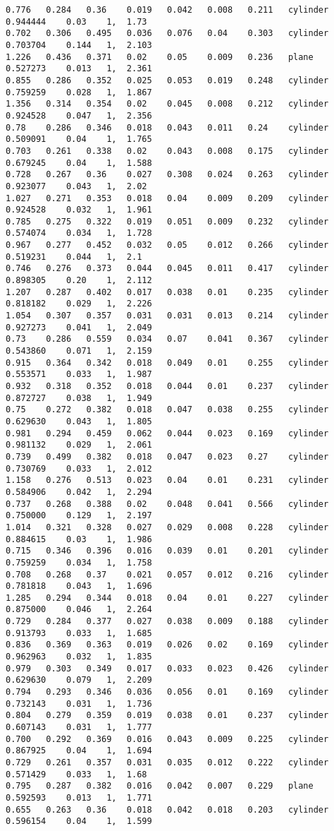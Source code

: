 {\begin{lstlisting}[caption={Datos obtenidos para la prueba del cilindro usando AGC.}]
0.776	0.284	0.36	0.019	0.042	0.008	0.211	cylinder	0.944444	0.03	1, 	1.73
0.702	0.306	0.495	0.036	0.076	0.04	0.303	cylinder	0.703704	0.144	1, 	2.103
1.226	0.436	0.371	0.02	0.05	0.009	0.236	plane		0.527273	0.013	1, 	2.361
0.855	0.286	0.352	0.025	0.053	0.019	0.248	cylinder	0.759259	0.028	1, 	1.867
1.356	0.314	0.354	0.02	0.045	0.008	0.212	cylinder	0.924528	0.047	1, 	2.356
0.78	0.286	0.346	0.018	0.043	0.011	0.24	cylinder	0.509091	0.04	1, 	1.765
0.703	0.261	0.338	0.02	0.043	0.008	0.175	cylinder	0.679245	0.04	1, 	1.588
0.728	0.267	0.36	0.027	0.308	0.024	0.263	cylinder	0.923077	0.043	1, 	2.02
1.027	0.271	0.353	0.018	0.04	0.009	0.209	cylinder	0.924528	0.032	1, 	1.961
0.785	0.275	0.322	0.019	0.051	0.009	0.232	cylinder	0.574074	0.034	1, 	1.728
0.967	0.277	0.452	0.032	0.05	0.012	0.266	cylinder	0.519231	0.044	1, 	2.1
0.746	0.276	0.373	0.044	0.045	0.011	0.417	cylinder	0.898305	0.20	1, 	2.112
1.207	0.287	0.402	0.017	0.038	0.01	0.235	cylinder	0.818182	0.029	1, 	2.226
1.054	0.307	0.357	0.031	0.031	0.013	0.214	cylinder	0.927273	0.041	1, 	2.049
0.73	0.286	0.559	0.034	0.07	0.041	0.367	cylinder	0.543860	0.071	1, 	2.159
0.915	0.364	0.342	0.018	0.049	0.01	0.255	cylinder	0.553571	0.033	1, 	1.987
0.932	0.318	0.352	0.018	0.044	0.01	0.237	cylinder	0.872727	0.038	1, 	1.949
0.75	0.272	0.382	0.018	0.047	0.038	0.255	cylinder	0.629630	0.043	1, 	1.805
0.981	0.294	0.459	0.062	0.044	0.023	0.169	cylinder	0.981132	0.029	1, 	2.061
0.739	0.499	0.382	0.018	0.047	0.023	0.27	cylinder	0.730769	0.033	1, 	2.012
1.158	0.276	0.513	0.023	0.04	0.01	0.231	cylinder	0.584906	0.042	1, 	2.294
0.737	0.268	0.388	0.02	0.048	0.041	0.566	cylinder	0.750000	0.129	1, 	2.197
1.014	0.321	0.328	0.027	0.029	0.008	0.228	cylinder	0.884615	0.03	1, 	1.986
0.715	0.346	0.396	0.016	0.039	0.01	0.201	cylinder	0.759259	0.034	1, 	1.758
0.708	0.268	0.37	0.021	0.057	0.012	0.216	cylinder	0.781818	0.043	1, 	1.696
1.285	0.294	0.344	0.018	0.04	0.01	0.227	cylinder	0.875000	0.046	1, 	2.264
0.729	0.284	0.377	0.027	0.038	0.009	0.188	cylinder	0.913793	0.033	1, 	1.685
0.836	0.369	0.363	0.019	0.026	0.02	0.169	cylinder	0.962963	0.032	1, 	1.835
0.979	0.303	0.349	0.017	0.033	0.023	0.426	cylinder	0.629630	0.079	1, 	2.209
0.794	0.293	0.346	0.036	0.056	0.01	0.169	cylinder	0.732143	0.031	1, 	1.736
0.804	0.279	0.359	0.019	0.038	0.01	0.237	cylinder	0.607143	0.031	1, 	1.777
0.700	0.292	0.369	0.016	0.043	0.009	0.225	cylinder	0.867925	0.04	1, 	1.694
0.729	0.261	0.357	0.031	0.035	0.012	0.222	cylinder	0.571429	0.033	1, 	1.68
0.795	0.287	0.382	0.016	0.042	0.007	0.229	plane		0.592593	0.013	1, 	1.771
0.655	0.263	0.36	0.018	0.042	0.018	0.203	cylinder	0.596154	0.04	1, 	1.599

\end{lstlisting}}
